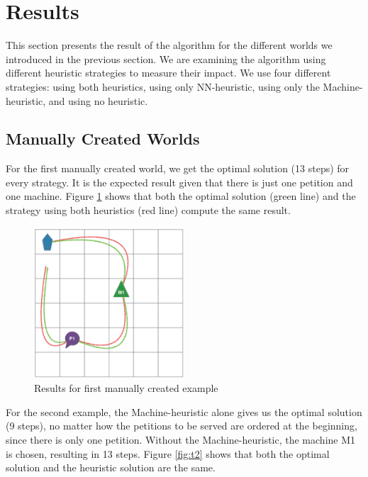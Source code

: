 \section{Results}
\label{sec:results}

This section presents the result of the algorithm for the different worlds we introduced in the previous section. We are examining the algorithm using different heuristic strategies to measure their impact. We use four different strategies: using both heuristics, using only NN-heuristic, using only the Machine-heuristic, and using no heuristic.

\subsection{Manually Created Worlds}

For the first manually created world, we get the optimal solution (13 steps) for every strategy. It is the expected result given that there is just one petition and one machine. Figure \ref{fig:t1} shows that both the optimal solution (green line) and the strategy using both heuristics (red line) compute the same result.

\begin{figure}[!hbt]
  \centering
  \includegraphics[width=0.5\textwidth]{img/t1}
  \caption{Results for first manually created example}
  \label{fig:t1}
\end{figure}

For the second example, the Machine-heuristic alone gives us the optimal solution (9 steps), no matter how the petitions to be served are ordered at the beginning, since there is only one petition. Without the Machine-heuristic, the machine M1 is chosen, resulting in 13 steps. Figure \ref{fig:t2} shows that both the optimal solution and the heuristic solution are the same.

